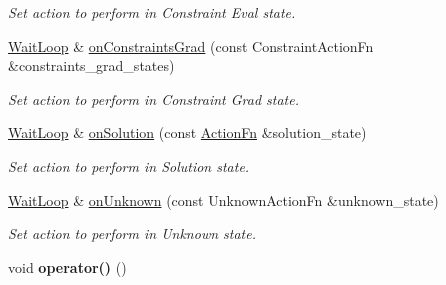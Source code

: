 \begin{DoxyCompactItemize}
\begin{DoxyCompactList}\small\item\em Set action to perform in Constraint Eval state. \end{DoxyCompactList}\item 
\hypertarget{classop_1_1WaitLoop_a36342ba05f774307b760d394f72ae28e}{\hyperlink{classop_1_1WaitLoop}{Wait\-Loop} \& \hyperlink{classop_1_1WaitLoop_a36342ba05f774307b760d394f72ae28e}{on\-Constraints\-Grad} (const Constraint\-Action\-Fn \&constraints\-\_\-grad\-\_\-states)}\label{classop_1_1WaitLoop_a36342ba05f774307b760d394f72ae28e}

\begin{DoxyCompactList}\small\item\em Set action to perform in Constraint Grad state. \end{DoxyCompactList}\item 
\hypertarget{classop_1_1WaitLoop_acd4493e0c35a825b9e67241ab5283c2d}{\hyperlink{classop_1_1WaitLoop}{Wait\-Loop} \& \hyperlink{classop_1_1WaitLoop_acd4493e0c35a825b9e67241ab5283c2d}{on\-Solution} (const \hyperlink{namespaceop_af8b17abb60b9f5c60c0a6764d5aa1228}{Action\-Fn} \&solution\-\_\-state)}\label{classop_1_1WaitLoop_acd4493e0c35a825b9e67241ab5283c2d}

\begin{DoxyCompactList}\small\item\em Set action to perform in Solution state. \end{DoxyCompactList}\item 
\hypertarget{classop_1_1WaitLoop_a850572325e547f4c075ab9c90c027c24}{\hyperlink{classop_1_1WaitLoop}{Wait\-Loop} \& \hyperlink{classop_1_1WaitLoop_a850572325e547f4c075ab9c90c027c24}{on\-Unknown} (const Unknown\-Action\-Fn \&unknown\-\_\-state)}\label{classop_1_1WaitLoop_a850572325e547f4c075ab9c90c027c24}

\begin{DoxyCompactList}\small\item\em Set action to perform in Unknown state. \end{DoxyCompactList}\item 
\hypertarget{classop_1_1WaitLoop_ae3b247bb891c2b207c3c6fefd94891b5}{void {\bfseries operator()} ()}\label{classop_1_1WaitLoop_ae3b247bb891c2b207c3c6fefd94891b5}

\end{DoxyCompactItemize}
